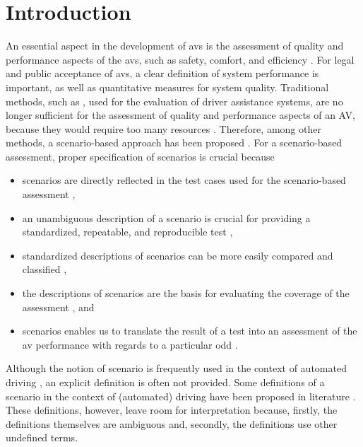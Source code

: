 \section{Introduction}
\label{sec:introduction}

An essential aspect in the development of \acp{av} is the assessment of quality and performance aspects of the \acp{av}, such as safety, comfort, and efficiency \autocite{gietelink2006development, bengler2014threedecades, stellet2015taxonomy, wachenfeld2016release, Helmer2017safety, putz2017pegasus, roesener2017comprehensive, riedmaier2020survey}.
For legal and public acceptance of \acp{av}, a clear definition of system performance is important, as well as quantitative measures for system quality. 
Traditional methods, such as \autocite{response2006code, ISO26262}, used for the evaluation of driver assistance systems, are no longer sufficient for the assessment of quality and performance aspects of an AV, because they would require too many resources \autocite{wachenfeld2016release}. 
Therefore, among other methods, a scenario-based approach has been proposed \autocite{putz2017pegasus, elrofai2018scenario, riedmaier2020survey}. 
For a scenario-based assessment, proper specification of scenarios is crucial \cstartc because 
\begin{itemize}
	\item scenarios are directly reflected in the test cases used for the scenario-based assessment \autocite{stellet2015taxonomy, aparicio2013pre, ulbrich2015, geyer2014, putz2017pegasus, zofka2015datadrivetrafficscenarios},
	\item an unambiguous description of a scenario is crucial for providing a standardized, repeatable, and reproducible test \autocite{aparicio2013pre},
	\item standardized descriptions of scenarios can be more easily compared and classified \autocite{degelder2019scenariocategories},
	\item the descriptions of scenarios are the basis for evaluating the coverage of the assessment \autocite{putz2017pegasus}, and
	\item scenarios enables us to translate the result of a test into an assessment of the \ac{av} performance with regards to a particular \ac{odd} \autocite{weber2019framework, gyllenhammar2020towards}.
\end{itemize}

Although the notion of scenario is frequently used in the context of automated driving \autocite{gietelink2006development, ebner2011identifying, hulshof2013autonomous, xiong2015orchestration, zofka2015datadrivetrafficscenarios, putz2017pegasus, roesener2017comprehensive, ploeg2017GCDC, shao2019evaluating}, an explicit definition is often not provided. \cendc
Some definitions of a scenario in the context of (automated) driving have been proposed in literature \autocite{geyer2014, ulbrich2015, elrofai2016scenario}.
These definitions, however, leave room for interpretation because, firstly, the definitions themselves are ambiguous and, secondly, the definitions use other undefined terms.

